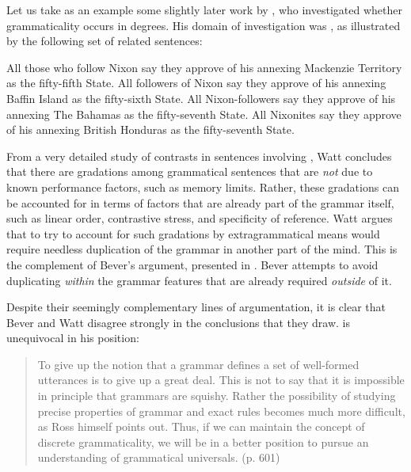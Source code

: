 Let us take as an example some slightly later work by \citet{Watt1975}, who investigated whether grammaticality occurs in degrees. His domain of investigation was , as illustrated by the following set of related sentences:

\ea
\ea All those who follow Nixon say they approve of his annexing Mackenzie Territory as the fifty-fifth State.
\ex All followers of Nixon say they approve of his annexing Baffin Island as the fifty-sixth State.
\ex All Nixon-followers  say they approve of his annexing The Bahamas as the fifty-seventh State.
\ex All Nixonites say they approve of his annexing British Honduras as the fifty-seventh  State.
\z
\z


\noindent
From a very detailed study of contrasts in sentences involving , Watt concludes that there are gradations among grammatical sentences that are
\textit{not} due to known performance factors, such as memory limits. Rather, these gradations can be accounted for in terms of factors that are already part of the grammar itself,  such as linear order, contrastive stress, and specificity of reference. Watt argues that to try to account for such gradations by extragrammatical means would require needless duplication of the grammar in another part of the mind. This is the complement of Bever's argument, presented in . Bever attempts to avoid duplicating \textit{within} the grammar features that are already required \textit{outside} of it.

Despite their seemingly complementary lines of argumentation, it is clear that Bever and Watt disagree strongly in the conclusions that they draw. \citet{Bever1975a} is unequivocal in his position:

\begin{quote}
To give up the notion that a grammar defines a set of well-formed utterances is to give up a great deal. This is not to say that it is impossible in principle  that  grammars  are  squishy.  Rather  the  possibility of studying precise properties of grammar and exact rules becomes much more difficult, as Ross himself  points out. Thus, if we can maintain the concept of discrete grammaticality, we will be in a better position to pursue an understanding of grammatical universals. (p. 601)
\end{quote}

